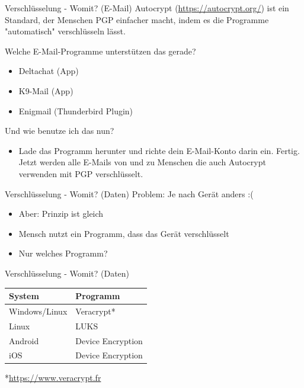 \documentclass{beamer}
\begin{document}
\begin{frame}{Verschlüsselung - Womit? (E-Mail)}
	Autocrypt (\url{https://autocrypt.org/}) ist ein Standard, der Menschen PGP einfacher macht, indem es die Programme "automatisch" verschlüsseln  lässt.\\
	\hspace{1cm}
	
	Welche E-Mail-Programme unterstützen das gerade?
	\begin{itemize}
	\item Deltachat (App)
	\item K9-Mail (App)
	\item Enigmail (Thunderbird Plugin)
	\end{itemize}
	\hspace{1cm}
	
	Und wie benutze ich das nun?
	\begin{itemize}
		\item Lade das Programm herunter und richte dein E-Mail-Konto darin ein. Fertig. Jetzt werden alle E-Mails von und zu Menschen die auch Autocrypt verwenden mit PGP verschlüsselt.
	\end{itemize}
\end{frame}

\begin{frame}{Verschlüsselung - Womit? (Daten)}
	Problem: Je nach Gerät anders :(
    \begin{itemize}
    	\item Aber: Prinzip ist gleich
    	\item Mensch nutzt ein Programm, dass das Gerät verschlüsselt
    	\item Nur welches Programm?
    \end{itemize}
\end{frame}

\begin{frame}{Verschlüsselung - Womit? (Daten)}
\begin{tabular}{ l | l }
	System & Programm \\\hline
	Windows/Linux & Veracrypt* \\
	Linux & LUKS \\
	Android & Device Encryption \\
	iOS & Device Encryption  \\
\end{tabular}

\hspace{2cm}

*\small{\url{https://www.veracrypt.fr}}
	
\end{frame}
\end{document}
